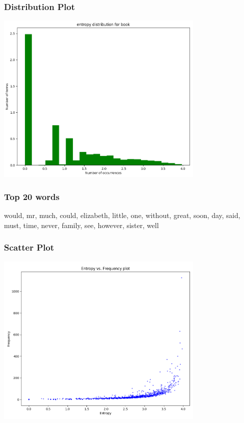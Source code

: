 \documentclass{article}
\begin{document}
\subsubsection{Distribution Plot}
\begin{flushleft}
	\includegraphics[width=0.75\textwidth]{./images/entropy-distribution-book.png}
\end{flushleft}
\subsubsection{Top 20 words}
\begin{flushleft}
    would, mr, much, could, elizabeth, little, one, without, great, soon, day, said, must, time, never, family, see, however, sister, well \\
\end{flushleft}
\subsubsection{Scatter Plot}
\begin{flushleft}
	\includegraphics[width=0.75\textwidth]{./images/scatter-plot.png}
\end{flushleft}
\end{document}
